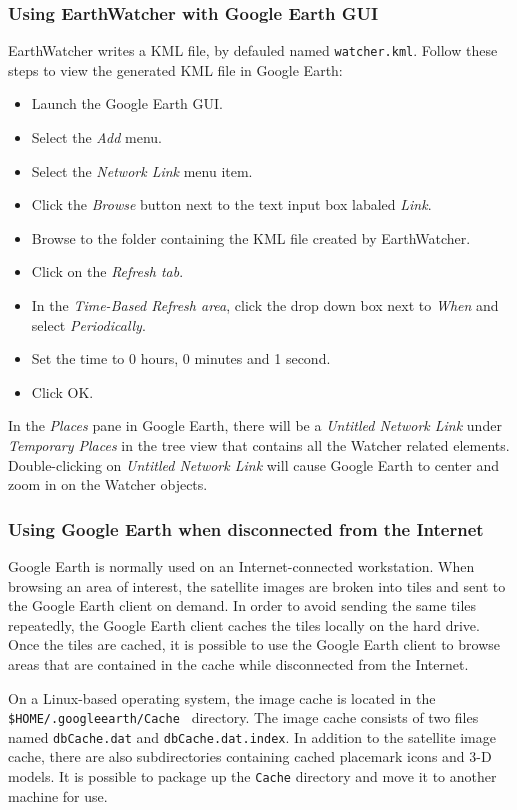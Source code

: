 \subsubsection{Using EarthWatcher with Google Earth GUI}

EarthWatcher writes a KML file, by defauled named {\tt watcher.kml}.  Follow
these steps to view the generated KML file in Google Earth:

\begin{itemize}
\item Launch the Google Earth GUI.
\item Select the {\it Add} menu.
\item Select the {\it Network Link} menu item.
\item Click the {\it Browse} button next to the text input box labaled {\it
Link}.
\item Browse to the folder containing the KML file created by EarthWatcher.
\item Click on the {\it Refresh tab}.
\item In the {\it Time-Based Refresh area}, click the drop down box next to {\it
When} and select {\it Periodically}.
\item Set the time to 0 hours, 0 minutes and 1 second.
\item Click OK.
\end{itemize}

In the {\it Places} pane in Google Earth, there will be a {\it Untitled Network Link}
under {\it Temporary Places} in the tree view that contains all the Watcher related
elements.  Double-clicking on {\it Untitled Network Link} will cause Google
Earth to center and zoom in on the Watcher objects.

\subsubsection{Using Google Earth when disconnected from the Internet}

Google Earth is normally used on an Internet-connected workstation.  When
browsing an area of interest, the satellite images are broken into tiles and
sent to the Google Earth client on demand.  In order to avoid sending the same
tiles repeatedly, the Google Earth client caches the tiles locally on the hard
drive.  Once the tiles are cached, it is possible to use the Google Earth client
to browse areas that are contained in the cache while disconnected from the
Internet.

On a Linux-based operating system, the image cache is located in the
{\tt \$HOME\slash .googleearth\slash Cache } directory.  The image cache consists of
two files named {\tt dbCache.dat} and {\tt dbCache.dat.index}.  In addition to
the satellite image cache, there are also subdirectories containing cached
placemark icons and 3-D models.  It is possible to package up the {\tt Cache}
directory and move it to another machine for use.

